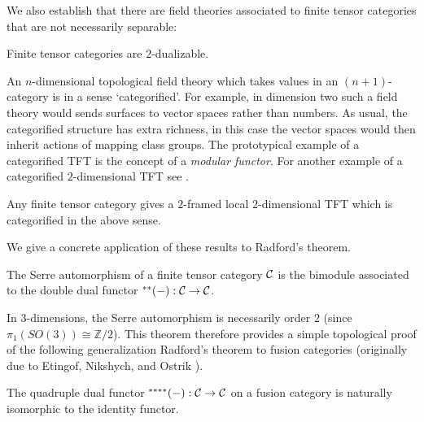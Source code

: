 \documentclass{amsart}
\begin{document}
We also establish that there are field theories associated to finite tensor categories that are not necessarily separable:

\begin{maintheorem} \label{thm4}
Finite tensor categories are $2$-dualizable.
\end{maintheorem}

An $n$-dimensional topological field theory which takes values in an $(n+1)$-category is in a sense `categorified'.  For example, in dimension two such a field theory would sends surfaces to vector spaces rather than numbers.  As usual, the categorified structure has extra richness, in this case the vector spaces would then inherit actions of mapping class groups. The prototypical example of a categorified TFT is the concept of a {\em modular functor}.  For another example of a categorified $2$-dimensional TFT see \cite{0904.1247}.

\begin{maincor} \label{cor5}
Any finite tensor category gives a $2$-framed local $2$-dimensional TFT which is categorified in the above sense. 
\end{maincor}

We give a concrete application of these results to Radford's theorem.

\begin{maintheorem} \label{thm6}
The Serre automorphism of a finite tensor category $\mathcal C$ is the bimodule associated to the double dual functor ${}^{**}(-): \mathcal C \rightarrow \mathcal C$.  %
\end{maintheorem}

In $3$-dimensions, the Serre automorphism is necessarily order $2$ (since $\pi_1(SO(3)) \cong \mathbb{Z}/2$). This theorem therefore provides a simple topological proof of the following generalization Radford's theorem \cite{MR0407069} to fusion categories (originally due to Etingof, Nikshych, and Ostrik \cite{MR2183279}).
\begin{maincor} \label{cor7}
The quadruple dual functor ${}^{****}(-): \mathcal C \rightarrow \mathcal C$ on a fusion category is naturally isomorphic to the identity functor.
\end{maincor}
\end{document}
